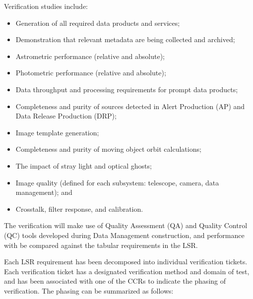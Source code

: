 
Verification studies include:

\begin{itemize}
	\item Generation of all required data products and services;
 	\item Demonstration that relevant metadata are being collected and archived;
	\item Astrometric performance (relative and absolute);
	\item Photometric performance (relative and absolute);
	\item Data throughput and processing requirements for prompt data products;
	\item Completeness and purity of sources detected in Alert Production (AP) and Data Release Production (DRP);
	\item Image template generation;
	\item Completeness and purity of moving object orbit calculations;
	\item The impact of stray light and optical ghosts;
	\item Image quality (defined for each subsystem: telescope, camera, data management); and
	\item Crosstalk, filter response, and calibration.
\end{itemize}

The verification will make use of Quality Assessment (QA) and Quality Control (QC) tools developed during Data Management construction, and performance with be compared against the tabular requirements in the LSR.


Each LSR requirement has been decomposed into individual verification tickets. Each verification ticket has a designated verification method and domain of test, and has been associated with one of the CCRs to indicate the phasing of verification. The phasing can be summarized as follows:

